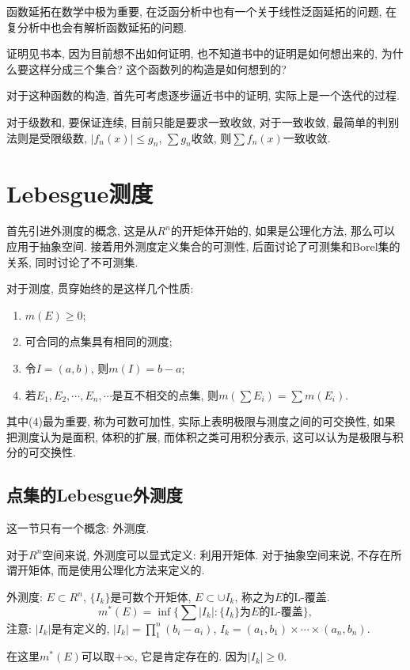 \documentclass[12pt,a4paper,openany]{book}
\begin{document}
\begin{enumerate}
函数延拓在数学中极为重要, 在泛函分析中也有一个关于线性泛函延拓的问题, 在复分析中也会有解析函数延拓的问题. 

证明见书本, 因为目前想不出如何证明, 也不知道书中的证明是如何想出来的, 为什么要这样分成三个集合? 这个函数列的构造是如何想到的?

对于这种函数的构造, 首先可考虑逐步逼近书中的证明, 实际上是一个迭代的过程.

对于级数和, 要保证连续, 目前只能是要求一致收敛, 对于一致收敛, 最简单的判别法则是受限级数, $|f_n(x)| \le g_n$, $\sum{g_n}$收敛, 则$\sum{f_n(x)}$一致收敛.
\end{enumerate}

\chapter{Lebesgue测度}
首先引进外测度的概念, 这是从$R^n$的开矩体开始的, 如果是公理化方法, 那么可以应用于抽象空间. 接着用外测度定义集合的可测性, 后面讨论了可测集和Borel集的关系, 同时讨论了不可测集.

对于测度, 贯穿始终的是这样几个性质:
\begin{enumerate}
\item $m(E) \ge 0$;
\item 可合同的点集具有相同的测度;
\item 令$I = (a, b)$, 则$m(I) = b - a$;
\item 若$E_1, E_2, \cdots, E_n, \cdots$是互不相交的点集, 则$m(\sum{E_i}) = \sum{m(E_i)}$.
\end{enumerate}
其中(4)最为重要, 称为可数可加性, 实际上表明极限与测度之间的可交换性, 如果把测度认为是面积, 体积的扩展, 而体积之类可用积分表示, 这可以认为是极限与积分的可交换性.

\section{点集的Lebesgue外测度}
这一节只有一个概念: 外测度.

对于$R^n$空间来说, 外测度可以显式定义: 利用开矩体. 对于抽象空间来说, 不存在所谓开矩体, 而是使用公理化方法来定义的.

外测度: $E \subset R^n$, $\{I_k\}$是可数个开矩体, $E \subset \cup{I_k}$, 称之为$E$的L-覆盖.
\[
m^*(E) = \inf\{\sum|I_k| : \{I_k\}\text{为}E的\text{L-覆盖} \},
\]
注意: $|I_k|$是有定义的, $|I_k| = \prod_{1}^{n}(b_i - a_i)$, $I_k = (a_1, b_1) \times \cdots \times (a_n, b_n)$.

在这里$m^*(E)$可以取$+\infty$, 它是肯定存在的. 因为$|I_k| \ge 0$.
\end{document}
